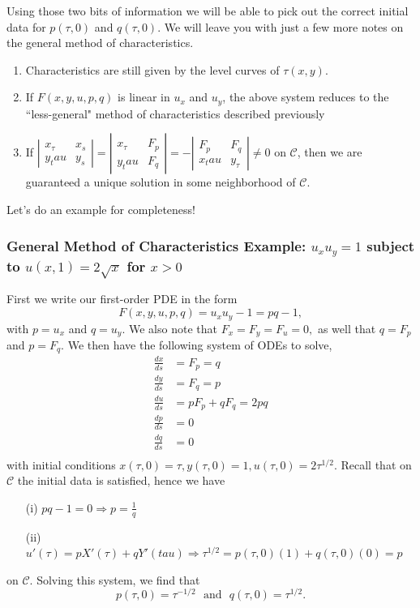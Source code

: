 Using those two bits of information we will be able to pick out the correct initial data for $p(\tau,0)$ and $q(\tau,0)$. We will leave you with just a few more notes on the general method of characteristics. 
\begin{enumerate}
\item Characteristics are still given by the level curves of $\tau(x,y)$.
\item If $F(x,y,u,p,q)$ is linear in $u_x$ and $u_y$, the above system reduces to the ``less-general" method of characteristics described previously
\item If $\left| \begin{array}{cc} x_\tau & x_s \\ y_tau & y_s \end{array}\right| = \left| \begin{array}{cc} x_\tau & F_p \\ y_tau & F_q \end{array}\right| = - \left| \begin{array}{cc} F_p & F_q \\ x_tau & y_\tau \end{array}\right| \neq 0$ on $\mathscr{C}$, then we are guaranteed a unique solution in some neighborhood of $\mathscr{C}.$
\end{enumerate}

Let's do an example for completeness!

%
%
\subsubsection{General Method of Characteristics Example: $u_x u_y = 1$ subject to $u(x,1) = 2\sqrt{x}$ for $x>0$}

First we write our first-order PDE in the form $$F(x,y,u,p,q) = u_x u_y -1 = pq -1,$$ with $p=u_x$ and $q=u_y$. We also note that $F_x=F_y=F_u=0,$ as well that $q = F_p$ and $p=F_q$. We then have the following system of ODEs to solve,
\begin{align*}
\frac{dx}{ds} &= F_p = q \\
\frac{dy}{ds} &= F_q = p \\
\frac{du}{ds} &= pF_p + qF_q = 2pq \\
\frac{dp}{ds} &= 0\\
\frac{dq}{ds} &= 0\\
\end{align*}
with initial conditions $x(\tau,0)=\tau, y(\tau,0)=1, u(\tau,0)=2\tau^{1/2}.$ Recall that on $\mathscr{C}$ the initial data is satisfied, hence we have 
\begin{itemize}
\item[(i)] $pq-1 = 0\Rightarrow p = \frac{1}{q} $ 
\item[(ii)] $u'(\tau) = pX'(\tau) + qY'(tau) \Rightarrow \tau^{1/2} = p(\tau,0)(1) + q(\tau,0)(0) = p$
\end{itemize}
on $\mathscr{C}$. Solving this system, we find that $$p(\tau,0) = \tau^{-1/2} \ \ \ \mbox{and} \ \ \ q(\tau,0)=\tau^{1/2}.$$

